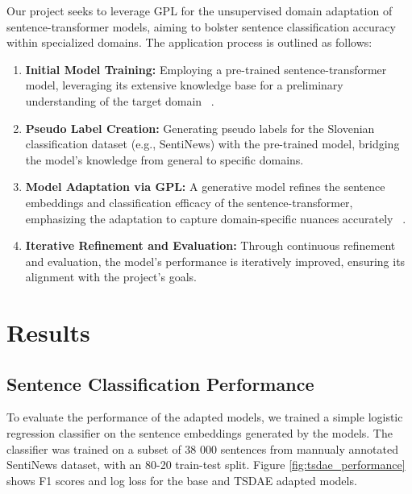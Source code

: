 \documentclass[fleqn,moreauthors,10pt]{ds_report}
\begin{document}
Our project seeks to leverage GPL for the unsupervised domain adaptation of sentence-transformer models, aiming to bolster sentence classification accuracy within specialized domains. The application process is outlined as follows:
\begin{enumerate}
    \item \textbf{Initial Model Training:} Employing a pre-trained sent\-ence-transformer model, leveraging its extensive knowledge base for a preliminary understanding of the target domain ~\cite{reimers2019sentence}.
    
    \item \textbf{Pseudo Label Creation:} Generating pseudo labels for the Slovenian classification dataset (e.g., SentiNews) with the pre-trained model, bridging the model's knowledge from general to specific domains.

    \item \textbf{Model Adaptation via GPL:} A generative model refines the sentence embeddings and classification efficacy of the sentence-transformer, emphasizing the adaptation to capture domain-specific nuances accurately ~\cite{wang-etal-2022-gpl}.

    \item \textbf{Iterative Refinement and Evaluation:} Through continuous refinement and evaluation, the model's performance is iteratively improved, ensuring its alignment with the project's goals.
\end{enumerate}    


\section*{Results}

\subsection*{Sentence Classification Performance}
To evaluate the performance of the adapted models, we trained a simple logistic regression classifier on the sentence embeddings generated by the models.
The classifier was trained on a subset of 38 000 sentences from mannualy annotated SentiNews dataset, with an 80-20 train-test split.
Figure \ref{fig:tsdae_performance} shows F1 scores and log loss for the base and TSDAE adapted models.
\end{document}
